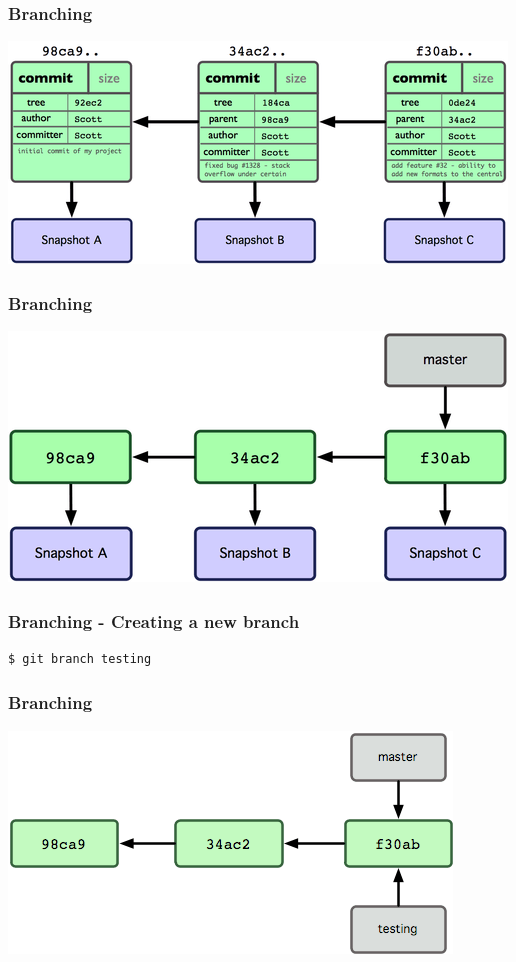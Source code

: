 \documentclass{beamer}
\begin{document}
\begin{frame}
\frametitle{Branching}
\begin{center}
  \includegraphics[width=\textwidth,height=0.6\textheight,keepaspectratio]{imgs/branch01.png}
\end{center}
\end{frame}

\begin{frame}
\frametitle{Branching}
\begin{center}
  \includegraphics[width=\textwidth,height=0.6\textheight,keepaspectratio]{imgs/branch02.png}
\end{center}
\end{frame}

\begin{frame}[fragile]
\frametitle{Branching - Creating a new branch}
\begin{lstlisting}
$ git branch testing
\end{lstlisting}
\end{frame}

\begin{frame}
\frametitle{Branching}
\begin{center}
  \includegraphics[width=\textwidth,height=0.6\textheight,keepaspectratio]{imgs/branch03.png}
\end{center}
\end{frame}
\end{document}
